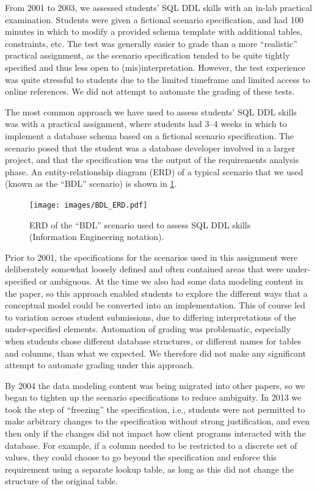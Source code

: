 \documentclass[sigconf, authordraft, capitalise]{acmart}
\begin{document}
From 2001 to 2003, we assessed students' SQL DDL skills with an in-lab practical examination. Students were given a fictional scenario specification, and had 100 minutes in which to modify a provided schema template with additional tables, constraints, etc. The test was generally easier to grade than a more ``realistic'' practical assignment, as the scenario specification tended to be quite tightly specified and thus less open to (mis)interpretation. However, the test experience was quite stressful to students due to the limited timeframe and limited access to online references. We did not attempt to automate the grading of these tests.

The most common approach we have used to assess students' SQL DDL skills was with a practical assignment, where students had 3--4 weeks in which to implement a database schema based on a fictional scenario specification. The scenario posed that the student was a database developer involved in a larger project, and that the specification was the output of the requirements analysis phase. An entity-relationship diagram (ERD) of a typical scenario that we used (known as the ``BDL'' scenario) is shown in \cref{fig-ERD}.
 
 
\begin{figure}[hb]
    \centering
    \texttt{[image: images/BDL\_ERD.pdf]} 
    \caption{ERD of the ``BDL'' scenario used to assess SQL DDL skills (Information Engineering notation).}
    \label{fig-ERD}
\end{figure}


Prior to 2001, the specifications for the scenarios used in this assignment were deliberately somewhat loosely defined and often contained areas that were under-specified or ambiguous. At the time we also had some data modeling content in the paper, so this approach enabled students to explore the different ways that a conceptual model could be converted into an implementation. This of course led to variation across student submissions, due to differing interpretations of the under-specified elements. Automation of grading was problematic, especially when students chose different database structures, or different names for tables and columns, than what we expected. We therefore did not make any significant attempt to automate grading under this approach.

By 2004 the data modeling content was being migrated into other papers, so we began to tighten up the scenario specifications to reduce ambiguity. In 2013 we took the step of ``freezing'' the specification, i.e., students were not permitted to make arbitrary changes to the specification without strong justification, and even then only if the changes did not impact how client programs interacted with the database. For example, if a column needed to be restricted to a discrete set of values, they could choose to go beyond the specification and enforce this requirement using a separate lookup table, as long as this did not change the structure of the original table.
\end{document}

